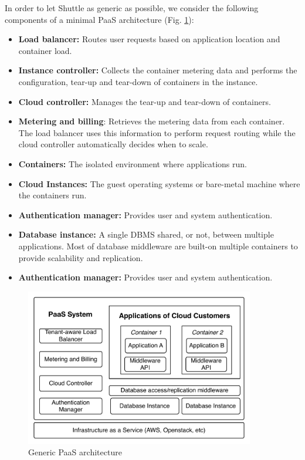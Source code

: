 In order to let Shuttle as generic as possible, we consider the following components of a minimal \ac{PaaS} architecture (Fig. \ref{fig:paasArchitecture}):
\begin{itemize}
\item \textbf{Load balancer:} Routes user requests based on application location and container load.
\item \textbf{Instance controller:} Collects the container metering data and performs the configuration, tear-up and tear-down of containers in the instance.
\item \textbf{Cloud controller:} Manages the tear-up and tear-down of containers.
\item \textbf{Metering and billing}: Retrieves the metering data from each container. The load balancer uses this information to perform request routing while the cloud controller automatically decides when to scale.
\item \textbf{Containers:} The isolated environment where applications run.
\item \textbf{Cloud Instances:} The guest operating systems or bare-metal machine where the containers run.
\item \textbf{Authentication manager:} Provides user and system authentication.
\item \textbf{Database instance:} A single \ac{DBMS} shared, or not, between multiple applications. Most of database middleware are built-on multiple containers to provide scalability and replication.
\item \textbf{Authentication manager:} Provides user and system authentication.
\end{itemize}

\begin{figure}
\centering
\includegraphics[width=100mm]{images/paas}
\caption{Generic \ac{PaaS} architecture}
\label{fig:paasArchitecture}
\end{figure}


